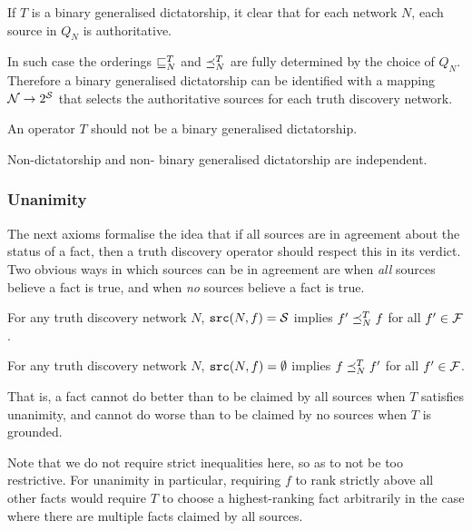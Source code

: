 \documentclass[../main.tex]{subfiles}
\begin{document}
\begin{remark}
If $T$ is a binary generalised dictatorship, it clear that for each network
$N$, each source in $Q_N$ is authoritative.

In such case the orderings $\sqsubseteq_N^T$ and $\preceq_N^T$ are fully determined by
the choice of $Q_N$. Therefore a binary generalised dictatorship can be
identified with a mapping $\mathcal{N} \rightarrow 2^{\mathcal{S}}$ that selects the authoritative
sources for each truth discovery network.
\end{remark}

\begin{axiom}
\label{axiom:non_bin_gen_dict}
An operator $T$ should not be a binary generalised dictatorship.
\end{axiom}

\begin{proposition}
\label{prop:non_dict_and_non_bin_gen_dict_indep}
Non-dictatorship and non- binary generalised dictatorship are independent.
\end{proposition}

\subsubsection{Unanimity}

The next axioms formalise the idea that if all sources are in agreement about
the status of a fact, then a truth discovery operator should respect this in
its verdict. Two obvious ways in which sources can be in agreement are when
\emph{all} sources believe a fact is true, and when \emph{no} sources believe a
fact is true.

\begin{axiom}[Unanimity]
\label{axiom:unanimity}
For any truth discovery network $N$, $\texttt{src}(N, f) = \mathcal{S}$ implies $f' \preceq_N^T f$
for all $f' \in \mathcal{F}$.
\end{axiom}

\begin{axiom}[Groundedness]
\label{axiom:groundedness}
For any truth discovery network $N$, $\texttt{src}(N, f) = \emptyset$ implies $f
\preceq_N^T f'$ for all $f' \in \mathcal{F}$.
\end{axiom}

That is, a fact cannot do better than to be claimed by all sources when $T$
satisfies unanimity, and cannot do worse than to be claimed by no sources when
$T$ is grounded.

Note that we do not require strict inequalities here, so as to not be too
restrictive. For unanimity in particular, requiring $f$ to rank strictly above
all other facts would require $T$ to choose a highest-ranking fact arbitrarily
in the case where there are multiple facts claimed by all sources.
\end{document}
